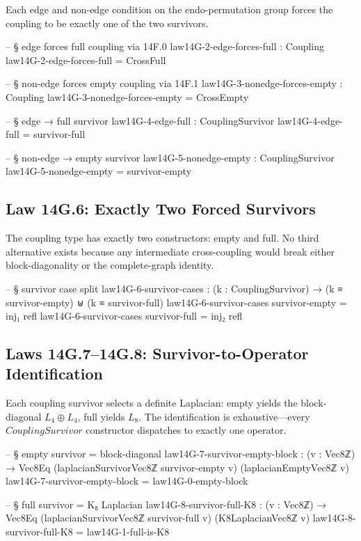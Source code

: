 \documentclass[11pt,a4paper]{book}
\def\mathrm#1{#1}%
\begin{document}
Each edge and non-edge condition on the endo-permutation group forces the
coupling to be exactly one of the two survivors.

\begin{code}
-- § edge forces full coupling via 14F.0
law14G-2-edge-forces-full : Coupling
law14G-2-edge-forces-full = CrossFull

-- § non-edge forces empty coupling via 14F.1
law14G-3-nonedge-forces-empty : Coupling
law14G-3-nonedge-forces-empty = CrossEmpty

-- § edge → full survivor
law14G-4-edge-full : CouplingSurvivor
law14G-4-edge-full = survivor-full

-- § non-edge → empty survivor
law14G-5-nonedge-empty : CouplingSurvivor
law14G-5-nonedge-empty = survivor-empty
\end{code}

\subsection{Law 14G.6: Exactly Two Forced Survivors}

The coupling type has exactly two constructors: empty and full.
No third alternative exists because any intermediate cross-coupling would break either block-diagonality or the complete-graph identity.

\begin{code}
-- § survivor case split
law14G-6-survivor-cases : (k : CouplingSurvivor) → (k ≡ survivor-empty) ⊎ (k ≡ survivor-full)
law14G-6-survivor-cases survivor-empty = inj₁ refl
law14G-6-survivor-cases survivor-full  = inj₂ refl
\end{code}

\subsection{Laws 14G.7--14G.8: Survivor-to-Operator Identification}

Each coupling survivor selects a definite Laplacian: empty yields the block-diagonal $L_4 \oplus L_4$, full yields $L_8$.
The identification is exhaustive---every $\mathrm{CouplingSurvivor}$ constructor dispatches to exactly one operator.

\begin{code}
-- § empty survivor = block-diagonal
law14G-7-survivor-empty-block : (v : Vec8ℤ) → Vec8Eq (laplacianSurvivorVec8ℤ survivor-empty v) (laplacianEmptyVec8ℤ v)
law14G-7-survivor-empty-block = law14G-0-empty-block

-- § full survivor = K₈ Laplacian
law14G-8-survivor-full-K8 : (v : Vec8ℤ) → Vec8Eq (laplacianSurvivorVec8ℤ survivor-full v) (K8LaplacianVec8ℤ v)
law14G-8-survivor-full-K8 = law14G-1-full-is-K8
\end{code}
\end{document}
